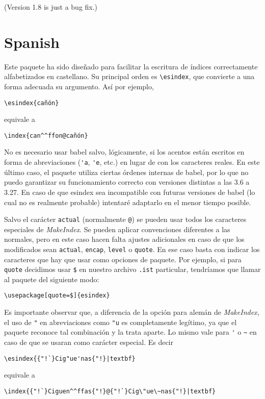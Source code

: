\documentclass[a4paper]{ltxguide}
\begin{document}
(Version 1.8 is just a bug fix.)

\section{Spanish}

Este paquete ha sido diseñado para facilitar la escritura de índices
correctamente alfabetizados en castellano. Su principal orden es
\verb|\esindex|, que convierte a una forma adecuada su argumento. Así
por ejemplo,
\begin{verbatim}
\esindex{cañón}
\end{verbatim}
equivale a
\begin{verbatim}
\index{can^^ffon@cañón}
\end{verbatim}
No es necesario usar \textsf{babel} salvo, lógicamente, si los acentos
están escritos en forma de abreviaciones (\verb|'a|, \verb|'e|, etc.)
en lugar de con los caracteres reales. En este último caso, el paquete
utiliza ciertas órdenes internas de \textsf{babel}, por lo que no puedo
garantizar su funcionamiento correcto con versiones distintas a las 3.6
a 3.27. En caso de que \textsf{esindex} sea incompatible con futuras
versiones de \textsf{babel} (lo cual no es realmente probable)
intentaré adaptarlo en el menor tiempo posible.

Salvo el carácter \verb|actual| (normalmente \verb|@|) se pueden usar
todos los caracteres especiales de \textit{MakeIndex}. Se pueden
aplicar convenciones diferentes a las normales, pero en este caso hacen
falta ajustes adicionales en caso de que los modificados sean
\verb|actual|, \verb|encap|, \verb|level| o \verb|quote|. En ese caso
basta con indicar los caracteres que hay que usar como opciones de
paquete. Por ejemplo, si para \verb|quote| decidimos usar \verb|$| en
nuestro archivo \verb|.ist| particular, tendríamos que llamar al
paquete del siguiente modo:
\begin{verbatim}
\usepackage[quote=$]{esindex}
\end{verbatim}

Es importante observar que, a diferencia de la opción para alemán de
\textit{MakeIndex}, el uso de \verb|"| en abreviaciones como \verb|"u|
es completamente legítimo, ya que el paquete reconoce tal combinación y
la trata aparte. Lo mismo vale para \verb|'| o \verb|~| en caso de que
se usaran como carácter especial. Es decir
\begin{verbatim}
\esindex{{"!`}Cig"ue'nas{"!}|textbf}
\end{verbatim}
equivale a
\begin{verbatim}
\index{{"!`}Ciguen^^ffas{"!}@{"!`}Cig\"ue\~nas{"!}|textbf}
\end{verbatim}
\end{document}
